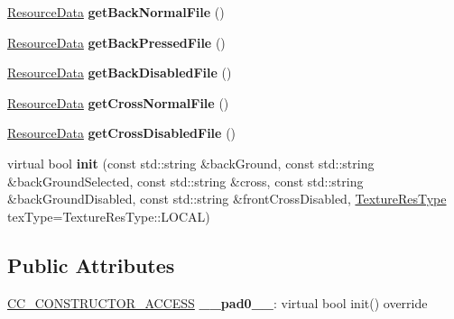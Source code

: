 \begin{DoxyCompactItemize}
\hyperlink{structResourceData}{Resource\+Data} {\bfseries get\+Back\+Normal\+File} ()
\item 
\mbox{\label{classui_1_1AbstractCheckButton_afbcea517326a799204b9582012c521c1}} 
\hyperlink{structResourceData}{Resource\+Data} {\bfseries get\+Back\+Pressed\+File} ()
\item 
\mbox{\label{classui_1_1AbstractCheckButton_ae00e42578fbd5239ec65df273ffd3620}} 
\hyperlink{structResourceData}{Resource\+Data} {\bfseries get\+Back\+Disabled\+File} ()
\item 
\mbox{\label{classui_1_1AbstractCheckButton_aa66ceb33d302e5dd62b9c52f37746b56}} 
\hyperlink{structResourceData}{Resource\+Data} {\bfseries get\+Cross\+Normal\+File} ()
\item 
\mbox{\label{classui_1_1AbstractCheckButton_af186b693cf16e7ed1d80555cdf4a12f0}} 
\hyperlink{structResourceData}{Resource\+Data} {\bfseries get\+Cross\+Disabled\+File} ()
\item 
\mbox{\label{classui_1_1AbstractCheckButton_abeebe6ffa0bb2d051d236c8053076abc}} 
virtual bool {\bfseries init} (const std\+::string \&back\+Ground, const std\+::string \&back\+Ground\+Selected, const std\+::string \&cross, const std\+::string \&back\+Ground\+Disabled, const std\+::string \&front\+Cross\+Disabled, \hyperlink{classui_1_1Widget_a040a65ec5ad3b11119b7e16b98bd9af0}{Texture\+Res\+Type} tex\+Type=Texture\+Res\+Type\+::\+L\+O\+C\+AL)
\end{DoxyCompactItemize}
\subsection*{Public Attributes}
\begin{DoxyCompactItemize}
\item 
\mbox{\label{classui_1_1AbstractCheckButton_a38c472fb66dd22042824b3229072f5e9}} 
\hyperlink{_2cocos2d_2cocos_2base_2ccConfig_8h_a25ef1314f97c35a2ed3d029b0ead6da0}{C\+C\+\_\+\+C\+O\+N\+S\+T\+R\+U\+C\+T\+O\+R\+\_\+\+A\+C\+C\+E\+SS} {\bfseries \+\_\+\+\_\+pad0\+\_\+\+\_\+}\+: virtual bool init() override
\end{DoxyCompactItemize}
